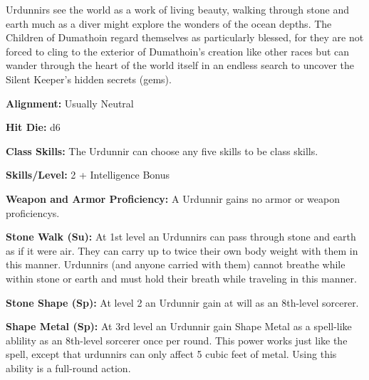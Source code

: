 
Urdunnirs see the world as a work of living beauty, walking through stone and earth much as a diver might explore the wonders of the ocean depths. The Children of Dumathoin regard themselves as particularly blessed, for they are not forced to cling to the exterior of Dumathoin’s creation like other races but can wander through the heart of the world itself in an endless search to uncover the Silent Keeper’s hidden secrets (gems).

\textbf{Alignment:} Usually Neutral

\textbf{Hit Die:} d6

\textbf{Class Skills:} The Urdunnir can choose any five skills to be class skills.

\textbf{Skills/Level:} 2 + Intelligence Bonus

\modebab{}
\poorfor{}
\poorref{}
\goodwil{}

\begin{classtable}
\end{classtable}

\classfeatures

\textbf{Weapon and Armor Proficiency:} A Urdunnir gains no armor or weapon proficiencys.

\textbf{Stone Walk (Su):} At 1st level an Urdunnirs can pass through stone and earth as if it were air. They can carry up to twice their own body weight with them in this manner. Urdunnirs (and anyone carried with them) cannot breathe while within stone or earth and must hold their breath while traveling in this manner.

\textbf{Stone Shape (Sp):} At level 2 an Urdunnir gain  at will as an 8th-level sorcerer.

\textbf{Shape Metal (Sp):} At 3rd level an Urdunnir gain Shape Metal as a spell-like ablility as an 8th-level sorcerer once per round. This power works just like the  spell, except that urdunnirs can only affect 5 cubic feet of metal. Using this ability is a full-round action.